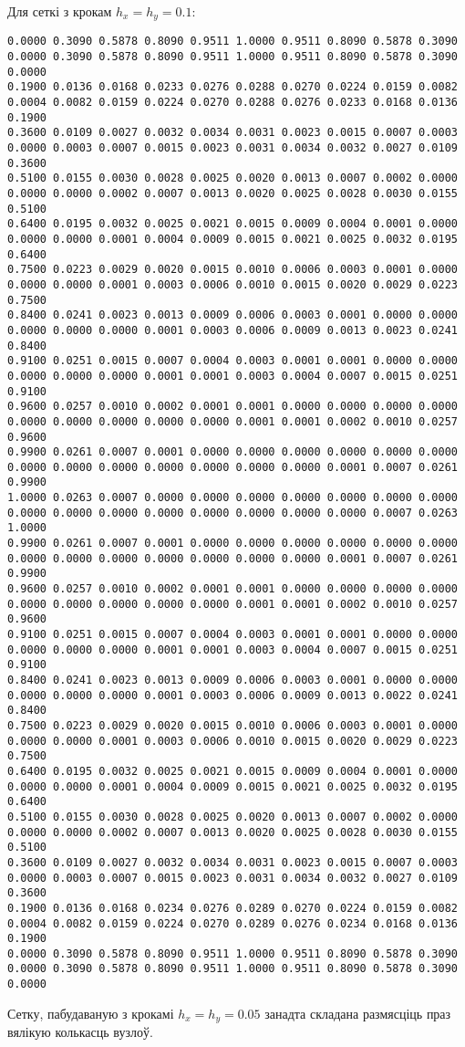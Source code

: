 Для сеткі з крокам $h_x = h_y = 0.1$:
{\tiny
\begin{verbatim}
0.0000 0.3090 0.5878 0.8090 0.9511 1.0000 0.9511 0.8090 0.5878 0.3090 0.0000 0.3090 0.5878 0.8090 0.9511 1.0000 0.9511 0.8090 0.5878 0.3090 0.0000
0.1900 0.0136 0.0168 0.0233 0.0276 0.0288 0.0270 0.0224 0.0159 0.0082 0.0004 0.0082 0.0159 0.0224 0.0270 0.0288 0.0276 0.0233 0.0168 0.0136 0.1900
0.3600 0.0109 0.0027 0.0032 0.0034 0.0031 0.0023 0.0015 0.0007 0.0003 0.0000 0.0003 0.0007 0.0015 0.0023 0.0031 0.0034 0.0032 0.0027 0.0109 0.3600
0.5100 0.0155 0.0030 0.0028 0.0025 0.0020 0.0013 0.0007 0.0002 0.0000 0.0000 0.0000 0.0002 0.0007 0.0013 0.0020 0.0025 0.0028 0.0030 0.0155 0.5100
0.6400 0.0195 0.0032 0.0025 0.0021 0.0015 0.0009 0.0004 0.0001 0.0000 0.0000 0.0000 0.0001 0.0004 0.0009 0.0015 0.0021 0.0025 0.0032 0.0195 0.6400
0.7500 0.0223 0.0029 0.0020 0.0015 0.0010 0.0006 0.0003 0.0001 0.0000 0.0000 0.0000 0.0001 0.0003 0.0006 0.0010 0.0015 0.0020 0.0029 0.0223 0.7500
0.8400 0.0241 0.0023 0.0013 0.0009 0.0006 0.0003 0.0001 0.0000 0.0000 0.0000 0.0000 0.0000 0.0001 0.0003 0.0006 0.0009 0.0013 0.0023 0.0241 0.8400
0.9100 0.0251 0.0015 0.0007 0.0004 0.0003 0.0001 0.0001 0.0000 0.0000 0.0000 0.0000 0.0000 0.0001 0.0001 0.0003 0.0004 0.0007 0.0015 0.0251 0.9100
0.9600 0.0257 0.0010 0.0002 0.0001 0.0001 0.0000 0.0000 0.0000 0.0000 0.0000 0.0000 0.0000 0.0000 0.0000 0.0001 0.0001 0.0002 0.0010 0.0257 0.9600
0.9900 0.0261 0.0007 0.0001 0.0000 0.0000 0.0000 0.0000 0.0000 0.0000 0.0000 0.0000 0.0000 0.0000 0.0000 0.0000 0.0000 0.0001 0.0007 0.0261 0.9900
1.0000 0.0263 0.0007 0.0000 0.0000 0.0000 0.0000 0.0000 0.0000 0.0000 0.0000 0.0000 0.0000 0.0000 0.0000 0.0000 0.0000 0.0000 0.0007 0.0263 1.0000
0.9900 0.0261 0.0007 0.0001 0.0000 0.0000 0.0000 0.0000 0.0000 0.0000 0.0000 0.0000 0.0000 0.0000 0.0000 0.0000 0.0000 0.0001 0.0007 0.0261 0.9900
0.9600 0.0257 0.0010 0.0002 0.0001 0.0001 0.0000 0.0000 0.0000 0.0000 0.0000 0.0000 0.0000 0.0000 0.0000 0.0001 0.0001 0.0002 0.0010 0.0257 0.9600
0.9100 0.0251 0.0015 0.0007 0.0004 0.0003 0.0001 0.0001 0.0000 0.0000 0.0000 0.0000 0.0000 0.0001 0.0001 0.0003 0.0004 0.0007 0.0015 0.0251 0.9100
0.8400 0.0241 0.0023 0.0013 0.0009 0.0006 0.0003 0.0001 0.0000 0.0000 0.0000 0.0000 0.0000 0.0001 0.0003 0.0006 0.0009 0.0013 0.0022 0.0241 0.8400
0.7500 0.0223 0.0029 0.0020 0.0015 0.0010 0.0006 0.0003 0.0001 0.0000 0.0000 0.0000 0.0001 0.0003 0.0006 0.0010 0.0015 0.0020 0.0029 0.0223 0.7500
0.6400 0.0195 0.0032 0.0025 0.0021 0.0015 0.0009 0.0004 0.0001 0.0000 0.0000 0.0000 0.0001 0.0004 0.0009 0.0015 0.0021 0.0025 0.0032 0.0195 0.6400
0.5100 0.0155 0.0030 0.0028 0.0025 0.0020 0.0013 0.0007 0.0002 0.0000 0.0000 0.0000 0.0002 0.0007 0.0013 0.0020 0.0025 0.0028 0.0030 0.0155 0.5100
0.3600 0.0109 0.0027 0.0032 0.0034 0.0031 0.0023 0.0015 0.0007 0.0003 0.0000 0.0003 0.0007 0.0015 0.0023 0.0031 0.0034 0.0032 0.0027 0.0109 0.3600
0.1900 0.0136 0.0168 0.0234 0.0276 0.0289 0.0270 0.0224 0.0159 0.0082 0.0004 0.0082 0.0159 0.0224 0.0270 0.0289 0.0276 0.0234 0.0168 0.0136 0.1900
0.0000 0.3090 0.5878 0.8090 0.9511 1.0000 0.9511 0.8090 0.5878 0.3090 0.0000 0.3090 0.5878 0.8090 0.9511 1.0000 0.9511 0.8090 0.5878 0.3090 0.0000
\end{verbatim}
}

Сетку, пабудаваную з крокамі $h_x = h_y = 0.05$ занадта складана размясціць праз вялікую колькасць вузлоў.\par
